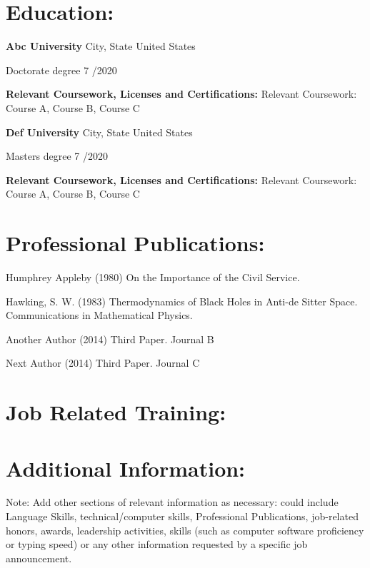 \documentclass{usajobs}
\begin{document}
\noindent\rlap{\rule{\textwidth}{.5mm}}

\section{Education:}

\textbf{Abc University} City, State United States

Doctorate degree 7 /2020

\vspace{1em}

\textbf{Relevant Coursework, Licenses and Certifications:}
Relevant Coursework: Course A, Course B, Course C

\noindent\rlap{\rule{\textwidth}{.5mm}}

\textbf{Def University} City, State United States

Masters degree 7 /2020

\vspace{1em}

\textbf{Relevant Coursework, Licenses and Certifications:}
Relevant Coursework: Course A, Course B, Course C

\noindent\rlap{\rule{\textwidth}{.5mm}}

\section{Professional Publications:}

Humphrey Appleby (1980) On the Importance of the Civil Service.

\vspace{1em}

Hawking, S. W. (1983) Thermodynamics of Black Holes in Anti-de Sitter Space. Communications in Mathematical Physics.

\vspace{1em}

Another Author (2014) Third Paper. Journal B

\vspace{1em}

Next Author (2014) Third Paper. Journal C

\noindent\rlap{\rule{\textwidth}{.5mm}}

\section{Job Related Training:}

\noindent\rlap{\rule{\textwidth}{.5mm}}

\section{Additional Information:}

Note: Add other sections of relevant information as necessary: could include Language Skills, technical/computer skills, Professional Publications, job-related honors, awards, leadership activities, skills (such as computer software proficiency or typing speed) or any other information requested by a specific job announcement.
\end{document}
